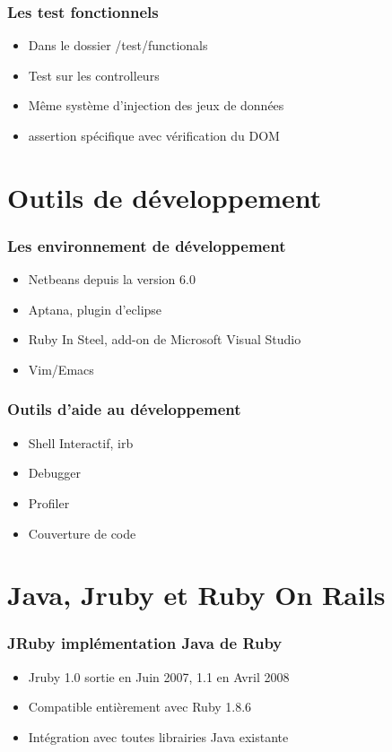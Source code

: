 \documentclass{beamer}
\begin{document}
\begin{frame}
    \frametitle{Les test fonctionnels}
    \begin{itemize}
        \item Dans le dossier /test/functionals
        \item Test sur les controlleurs
        \item Même système d'injection des jeux de données
        \item assertion spécifique avec vérification du DOM
    \end{itemize}
\end{frame}

\section{Outils de développement}

\begin{frame}
    \frametitle{Les environnement de développement}
    \begin{itemize}
        \item Netbeans depuis la version 6.0 
        \item Aptana, plugin d'eclipse
        \item Ruby In Steel, add-on de Microsoft Visual Studio
        \item Vim/Emacs
    \end{itemize}
\end{frame}

\begin{frame}
    \frametitle{Outils d'aide au développement}
    \begin{itemize}
        \item Shell Interactif, irb
        \item Debugger
        \item Profiler
        \item Couverture de code
    \end{itemize}
\end{frame}

\section{Java, Jruby et Ruby On Rails}

\begin{frame}
    \frametitle{JRuby implémentation Java de Ruby}
    \begin{itemize}
        \item Jruby 1.0 sortie en Juin 2007, 1.1 en Avril 2008
        \item Compatible entièrement avec Ruby 1.8.6
        \item Intégration avec toutes librairies Java existante
    \end{itemize}
\end{frame}
\end{document}
